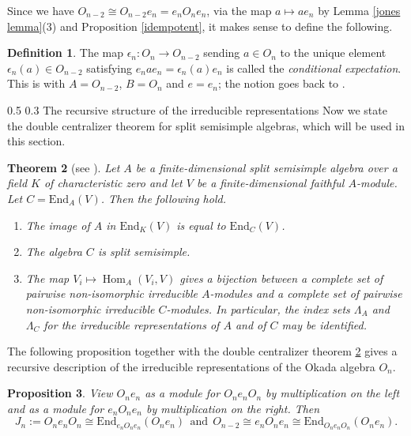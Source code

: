 \documentclass[12pt,reqno]{amsart}
\makeatletter
\renewcommand{\subsection}{\@startsection{subsection}{2}{0pt}%
  {0.5\baselineskip}%
  {0.3\baselineskip}%
  {\normalfont\bfseries}}
\numberwithin{equation}{section}
\newtheorem{theorem}{Theorem}[section]
\newtheorem{proposition}[theorem]{Proposition}
\theoremstyle{definition}
\newtheorem{definition}[theorem]{Definition}
\theoremstyle{definition}
\makeatother
\begin{document}
Since we have $O_{n-2} \cong O_{n-2}e_n = e_nO_ne_n$, via the map $a \mapsto ae_n$ by Lemma \ref{jones lemma}(3) and  Proposition \ref{idempotent}, it makes sense to define the following. 
\begin{definition}\label{conditional expectation}
The map $\epsilon_n\colon O_n \to O_{n-2}$ sending $a \in O_n$ to the unique
element $\epsilon_n(a) \in O_{n-2}$ satisfying $e_nae_n=\epsilon_n(a)e_n$ is
called the \emph{conditional expectation}. This is
\cite[(5.1.2)]{HalversonPartition} with $A=O_{n-2}$, $B=O_n$ and $e=e_n$; the
notion goes back to \cite{Jones}.
\end{definition}
\subsection{The recursive structure of the irreducible representations}
Now we state the double centralizer theorem for split semisimple algebras, which
will be used in this section.
\begin{theorem}[{see \cite[Theorem 1]{Andr}}]\label{double centralizer}
Let $A$ be a finite-dimensional split semisimple algebra over a field $K$ of
characteristic zero and let $V$ be a finite-dimensional faithful $A$-module.
Let $C=\mathrm{End}_A(V)$. Then the following hold.
\begin{enumerate}
\item The image of $A$ in $\mathrm{End}_K(V)$ is equal to $\mathrm{End}_C(V)$.
\item The algebra $C$ is split semisimple.
\item The map $V_i\mapsto \operatorname{Hom}_A(V_i,V)$ gives a bijection between
a complete set of pairwise non-isomorphic irreducible $A$-modules and a complete
set of pairwise non-isomorphic irreducible $C$-modules. In particular, the index
sets $\Lambda_A$ and $\Lambda_C$ for the irreducible representations of $A$ and
of $C$ may be identified.
\end{enumerate}
\end{theorem}
The following proposition together with the double centralizer theorem \ref{double centralizer} gives a recursive description of the irreducible representations of the Okada algebra $O_n$.
\begin{proposition}
     View $O_ne_n$ as a module for $O_ne_nO_n$ by multiplication on the left and as a module for $e_nO_ne_n$ by multiplication on the right. Then
    \[
     J_n:= O_ne_n O_n \cong \mathrm{End}_{e_nO_ne_n}(O_ne_n) ~~\text{and} ~~ O_{n-2} \cong e_nO_ne_n \cong \mathrm{End}_{O_ne_nO_n}(O_ne_n). 
    \] 
\end{proposition}
\end{document}
